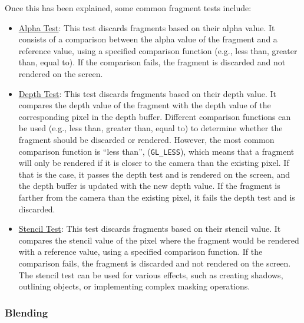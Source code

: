 Once this has been explained, some common fragment tests include:
\begin{itemize}
    \item \ul{Alpha Test}: This test discards fragments based on their alpha value. It consists of a comparison between the alpha value of the fragment and a reference value, using a specified comparison function (e.g., less than, greater than, equal to). If the comparison fails, the fragment is discarded and not rendered on the screen.
    \item \ul{Depth Test}: This test discards fragments based on their depth value. It compares the depth value of the fragment with the depth value of the corresponding pixel in the depth buffer. Different comparison functions can be used (e.g., less than, greater than, equal to) to determine whether the fragment should be discarded or rendered. However, the most common comparison function is ``less than'', (\texttt{GL\_LESS}), which means that a fragment will only be rendered if it is closer to the camera than the existing pixel. If that is the case, it passes the depth test and is rendered on the screen, and the depth buffer is updated with the new depth value. If the fragment is farther from the camera than the existing pixel, it fails the depth test and is discarded.
    \item \ul{Stencil Test}: This test discards fragments based on their stencil value. It compares the stencil value of the pixel where the fragment would be rendered with a reference value, using a specified comparison function. If the comparison fails, the fragment is discarded and not rendered on the screen. The stencil test can be used for various effects, such as creating shadows, outlining objects, or implementing complex masking operations.
\end{itemize}
\subsubsection{Blending}\label{sec:blending}

